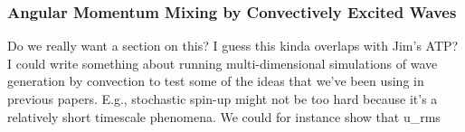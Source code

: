 {\color{purple}
\subsubsection{Angular Momentum Mixing by Convectively Excited Waves}}

Do we really want a section on this?  I guess this kinda overlaps with Jim's ATP?  I could write something about running multi-dimensional simulations of wave generation by convection to test some of the ideas that we've been using in previous papers.  E.g., stochastic spin-up might not be too hard because it's a relatively short timescale phenomena. We could for instance show that u_rms ~ 
